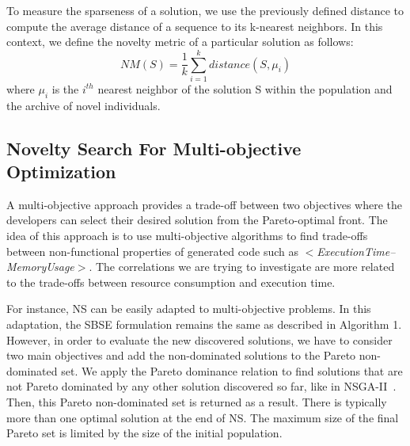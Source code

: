 To measure the sparseness of a solution, we use the previously defined distance to compute the average distance of a sequence to its k-nearest neighbors. In this context, we define the novelty metric of a particular solution as follows:
\begin{equation}
NM(S) = \frac{1}{k} \sum_{i=1}^{k} distance(S,\mu _{i})
\end{equation}
where $\mu _{i}$ is the $i^{th}$ nearest neighbor of the solution S within the population and the archive of novel individuals. 

\subsection{Novelty Search For Multi-objective Optimization}
A multi-objective approach provides a trade-off between two objectives where the developers can select their desired solution from the Pareto-optimal front. The idea of this approach is to use multi-objective algorithms to find trade-offs between non-functional properties of generated code such as \textit{$<$ExecutionTime--MemoryUsage$>$}. The correlations we are trying to investigate are more related to the trade-offs between resource consumption and execution time.
  
For instance, NS can be easily adapted to multi-objective problems. In this adaptation, the SBSE formulation remains the same as described in Algorithm 1. However, in order to evaluate the new discovered solutions, we have to consider two main objectives and add the non-dominated solutions to the Pareto non-dominated set. We apply the Pareto dominance relation to find solutions that are not Pareto dominated by any other solution discovered so far, like in NSGA-II~\cite{lokuciejewski2010multi, deb2002fast}. Then, this Pareto non-dominated set is returned as a result.
There is typically more than one optimal solution at the end of NS. The maximum size of the final Pareto set is limited by the size of the initial population.
